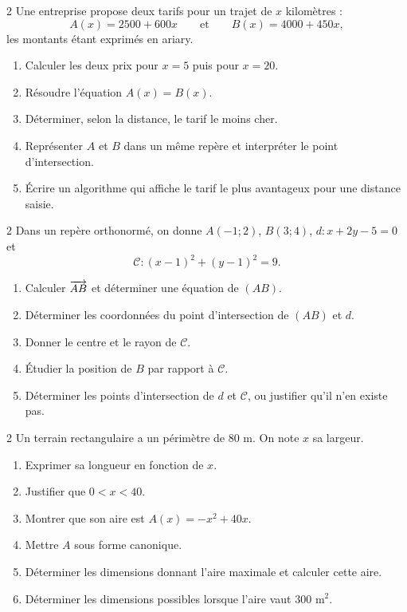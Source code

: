 \begin{probleme}{2}
Une entreprise propose deux tarifs pour un trajet de $x$ kilomètres :
\[
 A(x)=2500+600x
 \qquad\text{et}\qquad
 B(x)=4000+450x,
\]
les montants étant exprimés en ariary.
\begin{enumerate}
  \item Calculer les deux prix pour $x=5$ puis pour $x=20$.
  \item Résoudre l'équation $A(x)=B(x)$.
  \item Déterminer, selon la distance, le tarif le moins cher.
  \item Représenter $A$ et $B$ dans un même repère et interpréter le point
  d'intersection.
  \item Écrire un algorithme qui affiche le tarif le plus avantageux pour une
  distance saisie.
\end{enumerate}
\end{probleme}

\begin{probleme}{2}
Dans un repère orthonormé, on donne $A(-1;2)$, $B(3;4)$,
$d:x+2y-5=0$ et
\[
 \mathcal C:(x-1)^2+(y-1)^2=9.
\]
\begin{enumerate}
  \item Calculer $\overrightarrow{AB}$ et déterminer une équation de $(AB)$.
  \item Déterminer les coordonnées du point d'intersection de $(AB)$ et $d$.
  \item Donner le centre et le rayon de $\mathcal C$.
  \item Étudier la position de $B$ par rapport à $\mathcal C$.
  \item Déterminer les points d'intersection de $d$ et $\mathcal C$, ou
  justifier qu'il n'en existe pas.
\end{enumerate}
\end{probleme}

\begin{probleme}{2}
Un terrain rectangulaire a un périmètre de $80$ m. On note $x$ sa largeur.
\begin{enumerate}
  \item Exprimer sa longueur en fonction de $x$.
  \item Justifier que $0<x<40$.
  \item Montrer que son aire est $A(x)=-x^2+40x$.
  \item Mettre $A$ sous forme canonique.
  \item Déterminer les dimensions donnant l'aire maximale et calculer cette aire.
  \item Déterminer les dimensions possibles lorsque l'aire vaut $300$ m$^2$.
\end{enumerate}
\end{probleme}

